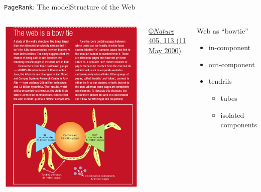 \documentclass[xcolor=table,final]{beamer} %
\newcommand{\PageRank}{\texttt{PageRank}\xspace}
\begin{document}
\begin{frame}{\PageRank : The model}{Structure of the Web}
  \begin{columns}
    \includegraphics[width=1.\textwidth]{figs/pdf/BowTieExtract}%

    \href{http://www.nature.com/nature/journal/v405/n6783/pdf/405113a0.pdf}{\tiny \copyright \underline{\textit{Nature}} 405, 113 (11 May \underline{2000})}

    \begin{block}{Web as ``bowtie''}
      \begin{itemize}
      \item in-component
      \item out-component
      \item tendrils
        \begin{itemize}
        \item tubes
        \item isolated components
        \end{itemize}
      \end{itemize}
    \end{block}


\end{columns}
\end{frame}
\end{document}
